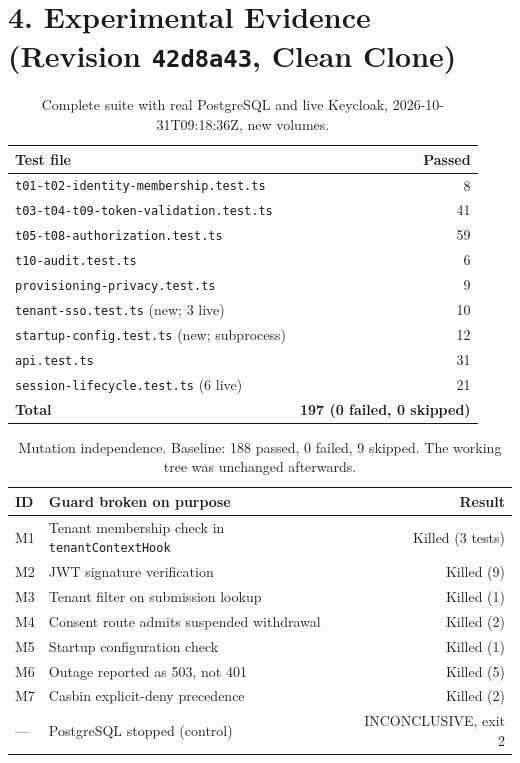 \documentclass{article}
\begin{document}
\section*{4. Experimental Evidence (Revision \texttt{42d8a43}, Clean Clone)}
\begin{table}[h!]
\centering
\begin{tabular}{lr}
\toprule
\textbf{Test file} & \textbf{Passed} \\
\midrule
\texttt{t01-t02-identity-membership.test.ts} & 8 \\
\texttt{t03-t04-t09-token-validation.test.ts} & 41 \\
\texttt{t05-t08-authorization.test.ts} & 59 \\
\texttt{t10-audit.test.ts} & 6 \\
\texttt{provisioning-privacy.test.ts} & 9 \\
\texttt{tenant-sso.test.ts} (new; 3 live) & 10 \\
\texttt{startup-config.test.ts} (new; subprocess) & 12 \\
\texttt{api.test.ts} & 31 \\
\texttt{session-lifecycle.test.ts} (6 live) & 21 \\
\midrule
\textbf{Total} & \textbf{197 (0 failed, 0 skipped)} \\
\bottomrule
\end{tabular}
\caption{Complete suite with real PostgreSQL and live Keycloak, 2026-10-31T09:18:36Z, new volumes.}
\end{table}

\begin{table}[h!]
\centering
\begin{tabular}{llr}
\toprule
\textbf{ID} & \textbf{Guard broken on purpose} & \textbf{Result} \\
\midrule
M1 & Tenant membership check in \texttt{tenantContextHook} & Killed (3 tests) \\
M2 & JWT signature verification & Killed (9) \\
M3 & Tenant filter on submission lookup & Killed (1) \\
M4 & Consent route admits suspended withdrawal & Killed (2) \\
M5 & Startup configuration check & Killed (1) \\
M6 & Outage reported as 503, not 401 & Killed (5) \\
M7 & Casbin explicit-deny precedence & Killed (2) \\
\midrule
--- & PostgreSQL stopped (control) & INCONCLUSIVE, exit 2 \\
\bottomrule
\end{tabular}
\caption{Mutation independence. Baseline: 188 passed, 0 failed, 9 skipped. The working tree was unchanged afterwards.}
\end{table}
\end{document}
